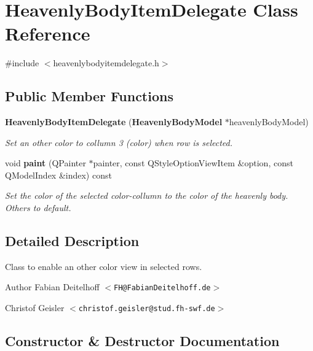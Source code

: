 \section{\-Heavenly\-Body\-Item\-Delegate \-Class \-Reference}
\label{dc/dc9/classHeavenlyBodyItemDelegate}


{\ttfamily \#include $<$heavenlybodyitemdelegate.\-h$>$}

\subsection*{\-Public \-Member \-Functions}
\begin{DoxyCompactItemize}
\item 
{\bf \-Heavenly\-Body\-Item\-Delegate} ({\bf \-Heavenly\-Body\-Model} $\ast$heavenly\-Body\-Model)
\begin{DoxyCompactList}\small\item\em \-Set an other color to collumn 3 (color) when row is selected. \end{DoxyCompactList}\item 
void {\bf paint} (\-Q\-Painter $\ast$painter, const \-Q\-Style\-Option\-View\-Item \&option, const \-Q\-Model\-Index \&index) const 
\begin{DoxyCompactList}\small\item\em \-Set the color of the selected color-\/collumn to the color of the heavenly body. \-Others to default. \end{DoxyCompactList}\end{DoxyCompactItemize}


\subsection{\-Detailed \-Description}
\-Class to enable an other color view in selected rows.

\begin{DoxyAuthor}{\-Author}
\-Fabian \-Deitelhoff $<${\tt \-F\-H@\-Fabian\-Deitelhoff.\-de}$>$ 

\-Christof \-Geisler $<${\tt christof.\-geisler@stud.\-fh-\/swf.\-de}$>$ 
\end{DoxyAuthor}


\subsection{\-Constructor \& \-Destructor \-Documentation}
